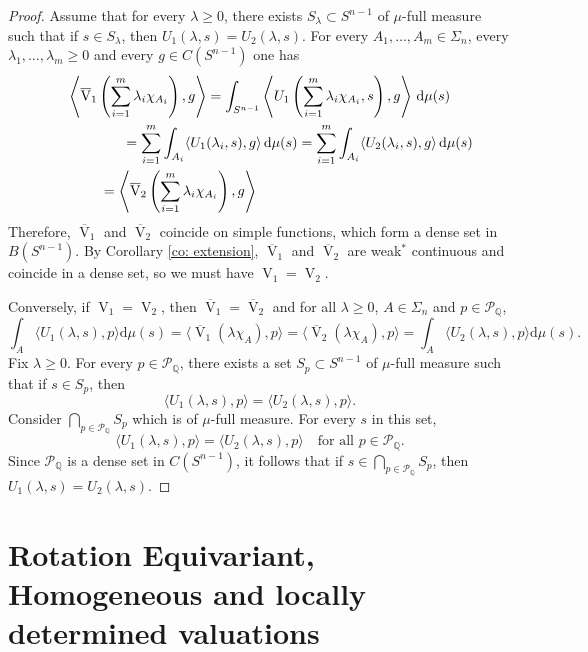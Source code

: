\documentclass[11pt, a4paper]{amsart}
\renewcommand{\d}{\,\mathrm{d}}
\newcommand{\sn}{{S^{n-1}}}
\renewcommand{\d}{\,\mathrm{d}}
\newcommand{\oV}{\operatorname{V}}
\newcommand{\poly}{\mathcal P_{\mathbb Q}}
\begin{document}
\begin{proof}
Assume that for every $\lambda\geq0$, there exists $S_\lambda\subset\sn$ of $\mu$-full measure such that if $s\in S_\lambda$, then $U_1(\lambda,s)=U_2(\lambda,s)$. For every $A_1,\dots,A_m\in\Sigma_n$, every $\lambda_1,\dots,\lambda_m\geq 0$ and every $g\in C(\sn)$ one has
\begin{multline*}
    \left\langle \overline{\oV}_1\left(\sum_{i=1}^m\lambda_i \chi_{A_i}\right),g\right\rangle=\int_{\sn}\left\langle U_1\left(\sum_{i=1}^m\lambda_i \chi_{A_i},s\right),g\right\rangle\d \mu(s)\\
    \hspace{20mm}=\sum_{i=1}^m\int_{A_i}\langle U_1(\lambda_i,s),g\rangle \d \mu(s)=\sum_{i=1}^m\int_{A_i}\langle U_2(\lambda_i,s),g\rangle \d \mu(s)\\
    =\left\langle \overline{\oV}_2\left(\sum_{i=1}^m\lambda_i \chi_{A_i}\right),g\right\rangle\hspace{40mm}
\end{multline*}
Therefore, $\overline{\oV}_1$ and $\overline{\oV}_2$ coincide on simple functions, which form a dense set in $B(\sn)$. By Corollary \ref{co: extension}, $\overline{\oV}_1$ and $\overline{\oV}_2$ are weak$^*$ continuous and coincide in a dense set, so we must have $\oV_1=\oV_2$.

Conversely, if $\oV_1=\oV_2$, then $\overline{\oV}_1=\overline{\oV}_2$ and for all $\lambda\geq0$, $A\in\Sigma_n$ and $p\in\poly$,
\[
    \int_{A}\langle U_1(\lambda,s),p\rangle\mathrm{d} \mu(s)=\langle \overline{\oV}_1(\lambda\chi_A),p\rangle =\langle \overline{\oV}_2(\lambda\chi_A),p\rangle=\int_A  \langle U_2(\lambda,s),p\rangle \mathrm{d} \mu(s).
\]
Fix $\lambda\geq 0$. For every $p\in\poly$, there exists a set $S_p\subset \sn$ of $\mu$-full measure such that if $s\in S_p$, then
\[
    \langle U_1(\lambda,s),p\rangle=\langle U_2(\lambda,s),p\rangle.
\]
Consider $\bigcap_{p\in\poly}S_p$ which is of $\mu$-full measure. For every $s$ in this set, 
\[
    \langle U_1(\lambda,s),p\rangle=\langle U_2(\lambda,s),p\rangle \quad \text{for all }p\in\poly.
\]
Since $\poly$ is a dense set in $C(\sn)$, it follows that if $s\in \bigcap_{p\in\poly}S_p$, then $U_1(\lambda,s)=U_2(\lambda,s)$.
\end{proof}
\goodbreak

\section{Rotation Equivariant, Homogeneous and locally determined valuations}\label{S:equivariant}
\end{document}
